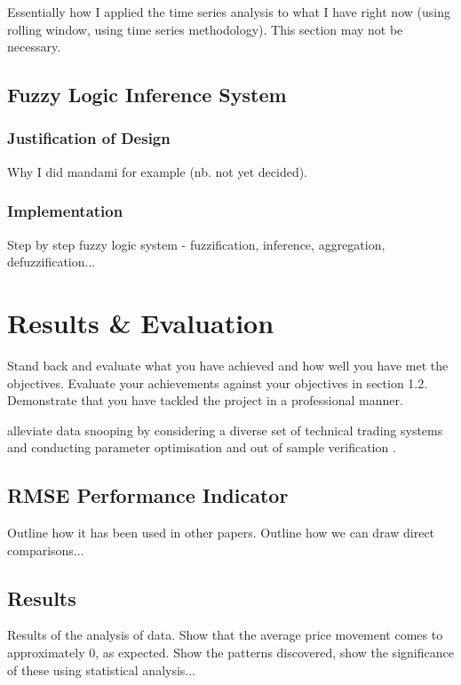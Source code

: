 \documentclass{article}
\begin{document}
Essentially how I applied the time series analysis to what I have right now (using rolling window, using time series methodology). This section may not be necessary.

\subsection{Fuzzy Logic Inference System}

\subsubsection{Justification of Design}

Why I did mandami for example (nb. not yet decided).

\subsubsection{Implementation}

Step by step fuzzy logic system - fuzzification, inference, aggregation, defuzzification...

\section{Results \& Evaluation}
Stand back and evaluate what you have achieved and how well you have met the objectives. Evaluate your achievements against your objectives in section 1.2. Demonstrate that you have tackled the project in a professional manner. 

alleviate data snooping by considering a diverse set of technical trading systems and conducting parameter optimisation and out of sample verification \citep{taprofitability}.

\subsection{RMSE Performance Indicator}

Outline how it has been used in other papers. Outline how we can draw direct comparisons...

\subsection{Results}

Results of the analysis of data. Show that the average price movement comes to approximately 0, as expected. Show the patterns discovered, show the significance of these using statistical analysis...
\end{document}
